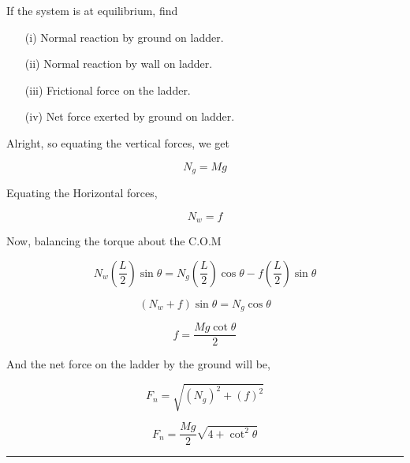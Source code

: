 \documentclass[twocolumn]{article}
\begin{document}
\begin{question}
    If the system is at equilibrium, find 
    \begin{itemize}
        \item[(i)] Normal reaction by ground on ladder. 
        \item[(ii)] Normal reaction by wall on ladder. 
        \item[(iii)] Frictional force on the ladder. 
        \item[(iv)] Net force exerted by ground on ladder.    
    \end{itemize}
    \begin{center}
    \end{center}
\end{question}

Alright, so equating the vertical forces, we get 

\[
    N_g = Mg
\]

Equating the Horizontal forces, 

\[
    N_w = f
\]

Now, balancing the torque about the C.O.M 

\[
    N_w (\frac{L}{2}) \sin \theta = N_g (\frac{L}{2}) \cos \theta - f(\frac{L}{2}) \sin \theta  
\]

\[
    (N_w + f) \sin \theta = N_g \cos \theta 
\]

\[
    \boxed{f = \frac{Mg \cot \theta }{2}}
\]

And the net force on the ladder by the ground will be, 

\[
    F_n = \sqrt{(N_g)^{2} + (f)^{2} } 
\]

\[
    \boxed{F_n = \frac{Mg}{2}\sqrt{4 + \cot ^{2} \theta } }
\]

\vspace{0.1in}
\hrule
\end{document}

